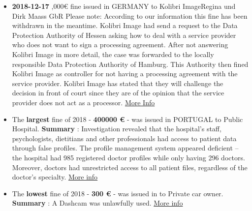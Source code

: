 \documentclass[12pt]{article}
\begin{document}
\begin{multicols}{2}
\begin{itemize}
			\item \textbf{2018-12-17} ,000€ fine issued in GERMANY to Kolibri ImageRegina und Dirk Maass GbR
			\newline
			Please note: According to our information this fine has been withdrawn in the meantime. Kolibri Image had send a request to the Data Protection Authority of Hessen asking how to deal with a service provider who does not want to sign a processing agreement. After not answering Kolibri Image in more detail, the case was forwarded to the locally responsible Data Protection Authority of Hamburg. This Authority then fined Kolibri Image as controller for not having a processing agreement with the service provider. Kolibri Image has stated that they will challenge the decision in front of court since they are of the opinion that the service provider does not act as a processor.
			\newline
			\href{https://www.heise.de/newsticker/meldung/DSGVO-5000-Euro-Bussgeld-fuer-fehlenden-Auftragsverarbeitungsvertrag-4282737.html}{More Info}
		\end{itemize}
	\end{multicols}

\newpage
\justify
	\begin{multicols}{2}
	\begin{itemize}
		\item The \textbf{largest} fine of 2018 - \textbf{400000 €} - was issued in PORTUGAL to Public Hospital.
		\newline
		\textbf{Summary} : Investigation revealed that the hospital’s staff, psychologists, dietitians and other professionals had access to patient data through false profiles.  The profile management system appeared deficient – the hospital had 985 registered doctor profiles while only having 296 doctors.  Moreover, doctors had unrestricted access to all patient files, regardless of the doctor’s specialty.
		\newline
		\href{https://www.cnpd.pt/bin/decisoes/Delib/20_984_2018.pdf}{More info}
		\vspace{1cm}
	
		\item The \textbf{lowest} fine of 2018 - \textbf{300 €} - was issued in  to Private car owner.
		\newline
		\textbf{Summary} : A Dashcam was unlawfully used.
		\newline
		\href{https://www.ris.bka.gv.at/Dokumente/Dsk/DSBT_20180927_DSB_D550_084_0002_DSB_2018_00/DSBT_20180927_DSB_D550_084_0002_DSB_2018_00.pdf}{More info}
	\end{itemize}
	\end{multicols}
\end{document}

